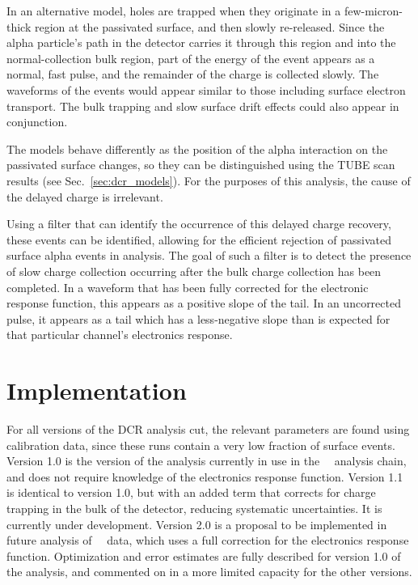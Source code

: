 In an alternative model, holes are trapped when they originate in a few-micron-thick region at the passivated surface, and then slowly re-released. Since the alpha particle's path in the detector carries it through this region and into the normal-collection bulk region, part of the energy of the event appears as a normal, fast pulse, and the remainder of the charge is collected slowly. The waveforms of the events would appear similar to those including surface electron transport. The bulk trapping and slow surface drift effects could also appear in conjunction. 

The models behave differently as the position of the alpha interaction on the passivated surface changes, so they can be distinguished using the TUBE scan results (see Sec.~\ref{sec:dcr_models}). For the purposes of this analysis, the cause of the delayed charge is irrelevant. 

Using a filter that can identify the occurrence of this delayed charge recovery, these events can be identified, allowing for the efficient rejection of passivated surface alpha events in analysis. The goal of such a filter is to detect the presence of slow charge collection occurring after the bulk charge collection has been completed. In a waveform that has been fully corrected for the electronic response function, this appears as a positive slope of the tail. In an uncorrected pulse, it appears as a tail which has a less-negative slope than is expected for that particular channel's electronics response. 

\section{Implementation}
For all versions of the DCR analysis cut, the relevant parameters are found using calibration data, since these runs contain a very low fraction of surface events. Version 1.0 is the version of the analysis currently in use in the \MJ\ \DEM\ analysis chain, and does not require knowledge of the electronics response function. Version 1.1 is identical to version 1.0, but with an added term that corrects for charge trapping in the bulk of the detector, reducing systematic uncertainties. It is currently under development. Version 2.0 is a proposal to be implemented in future analysis of \MJ\ \DEM\ data, which uses a full correction for the electronics response function. Optimization and error estimates are fully described for version 1.0 of the analysis, and commented on in a more limited capacity for the other versions. 

